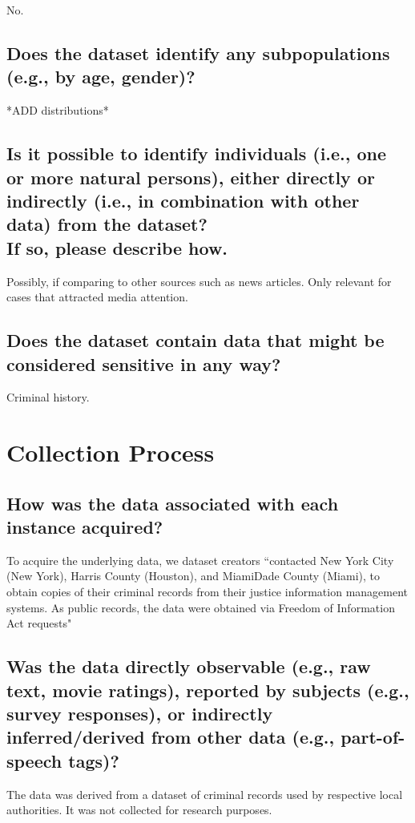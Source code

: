 \documentclass[letterpaper, 10 pt, conference]{ieeeconf}  %
\newcommand{\subtitle}[1]{{\\ \small \normalfont \color{purple} #1}}
\begin{document}
No.

\subsection{Does the dataset identify any subpopulations (e.g., by age, gender)?}

*ADD distributions*

\subsection{Is it possible to identify individuals (i.e., one or more natural persons), either directly or indirectly (i.e., in combination with other data) from the dataset? \subtitle{If so, please describe how.}}

Possibly, if comparing to other sources such as news articles. Only relevant for cases that attracted media attention. 

\subsection{Does the dataset contain data that might be considered sensitive in any way?}

Criminal history.


\section{Collection Process}

\subsection{How was the data associated with each instance acquired?}

To acquire the underlying data, we dataset creators ``contacted New York
City (New York), Harris County (Houston), and MiamiDade County (Miami), to obtain copies of their criminal records from their justice information management systems. As public records, the data were obtained via Freedom of Information Act requests"

\subsection{Was the data directly observable (e.g., raw text, movie ratings), reported by subjects (e.g., survey responses), or indirectly inferred/derived from other data (e.g., part-of-speech tags)?}

The data was derived from a dataset of criminal records used by respective local authorities. It was not collected for research purposes. 
\end{document}
